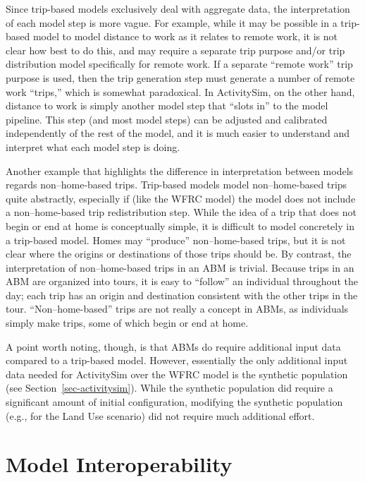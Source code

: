 \documentclass[fancy, oneside, mastersfancy, ms]{byuthesis}
\begin{document}
Since trip-based models exclusively deal with aggregate data, the
interpretation of each model step is more vague. For example, while it
may be possible in a trip-based model to model distance to work as it
relates to remote work, it is not clear how best to do this, and may
require a separate trip purpose and/or trip distribution model
specifically for remote work. If a separate ``remote work'' trip purpose
is used, then the trip generation step must generate a number of remote
work ``trips,'' which is somewhat paradoxical. In ActivitySim, on the
other hand, distance to work is simply another model step that ``slots
in'' to the model pipeline. This step (and most model steps) can be
adjusted and calibrated independently of the rest of the model, and it
is much easier to understand and interpret what each model step is
doing.

Another example that highlights the difference in interpretation between
models regards non--home-based trips. Trip-based models model
non--home-based trips quite abstractly, especially if (like the WFRC
model) the model does not include a non--home-based trip redistribution
step. While the idea of a trip that does not begin or end at home is
conceptually simple, it is difficult to model concretely in a trip-based
model. Homes may ``produce'' non--home-based trips, but it is not clear
where the origins or destinations of those trips should be. By contrast,
the interpretation of non--home-based trips in an ABM is trivial.
Because trips in an ABM are organized into tours, it is easy to
``follow'' an individual throughout the day; each trip has an origin and
destination consistent with the other trips in the tour.
``Non--home-based'' trips are not really a concept in ABMs, as
individuals simply make trips, some of which begin or end at home.

A point worth noting, though, is that ABMs do require additional input
data compared to a trip-based model. However, essentially the only
additional input data needed for ActivitySim over the WFRC model is the
synthetic population (see Section~\ref{sec-activitysim}). While the
synthetic population did require a significant amount of initial
configuration, modifying the synthetic population (e.g., for the Land
Use scenario) did not require much additional effort.

\section{Model Interoperability}\label{model-interoperability}
\end{document}
